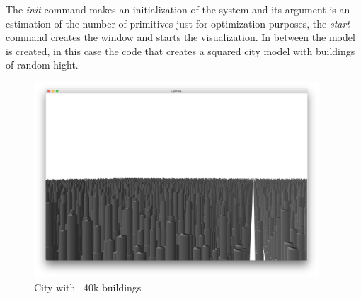 The \emph{init} command makes an initialization of the system and its argument is an estimation of the number of primitives just for optimization purposes, the \emph{start} command creates the window and starts the visualization. In between the model is created, in this case the code that creates a squared city model with buildings of random hight.

\colocarFiguraMaisRodada

\begin{figure}[htb]
	\centering
	\includegraphics[width=0.95\textwidth]{img/Solution/City5-racket.png}
	\caption{City with ~40k buildings}
	\label{fig:pic1}
\end{figure}



